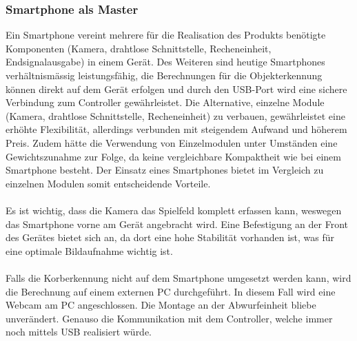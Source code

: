 \subsubsection{Smartphone als Master}
	Ein Smartphone vereint mehrere für die Realisation des Produkts benötigte 
	Komponenten (Kamera, drahtlose Schnittstelle, Recheneinheit, Endsignalausgabe) 
	in einem Gerät. Des Weiteren sind heutige Smartphones verhältnismässig 
	leistungsfähig, die Berechnungen für die Objekterkennung können direkt auf 
	dem Gerät erfolgen und durch den USB-Port wird eine sichere Verbindung zum 
	Controller gewährleistet. Die Alternative, einzelne Module (Kamera, drahtlose 
	Schnittstelle, Recheneinheit) zu verbauen, gewährleistet eine erhöhte 
	Flexibilität, allerdings verbunden mit steigendem Aufwand und höherem Preis. 
	Zudem hätte die Verwendung von Einzelmodulen unter Umständen eine 
	Gewichtszunahme zur Folge, da keine vergleichbare Kompaktheit wie bei einem 
	Smartphone besteht. Der Einsatz eines Smartphones bietet im Vergleich zu 
	einzelnen Modulen somit entscheidende Vorteile.\\
	\\
	Es ist wichtig, dass die Kamera das Spielfeld komplett erfassen kann, 
	weswegen das Smartphone vorne am Gerät angebracht wird. Eine Befestigung 
	an der Front des Gerätes bietet sich an, da dort eine hohe Stabilität 
	vorhanden ist, was für eine optimale Bildaufnahme wichtig ist.\\
	\\
	Falls die Korberkennung nicht auf dem Smartphone umgesetzt werden kann, 
	wird die Berechnung auf einem externen PC durchgeführt. In diesem Fall wird 
	eine Webcam am PC angeschlossen. Die Montage an der Abwurfeinheit bliebe unverändert. Genauso die Kommunikation mit dem Controller, welche immer noch mittels USB realisiert würde.
	\newpage
